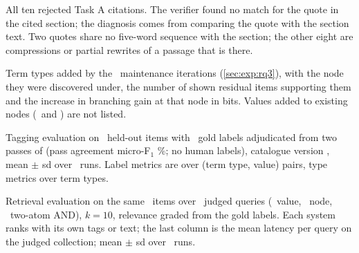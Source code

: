 \begin{table}[t]
  \centering
  \caption{All ten rejected Task A citations. The verifier found no match for
  the quote in the cited section; the diagnosis comes from comparing the quote
  with the section text. Two quotes share no five-word sequence with the
  section; the other eight are compressions or partial rewrites of a passage
  that is there.}
  \label{tab:errors}
  \scriptsize
  
\end{table}
\begin{table}[t]
  \centering
  \caption{Term types added by the \NIterWord\ maintenance iterations
  (\cref{sec:exp:rq3}), with the node they were discovered under, the number
  of shown residual items supporting them and the increase in branching gain
  at that node in bits. Values added to existing nodes (\EAddedValues\ and
  \TAddedValues) are not listed.}
  \label{tab:accepted}
  \scriptsize
  \begin{minipage}[t]{0.49\textwidth}\end{minipage}\hfill
  \begin{minipage}[t]{0.49\textwidth}\end{minipage}
\end{table}
\begin{table}[t]
  \centering
  \caption{Tagging evaluation on \GItems\ held-out items with \GLabels\
  gold labels adjudicated from two passes of \texttt{\GModel} (pass agreement
  micro-F$_1$ \GAgreement\%; no human labels), catalogue version \EvalCat,
  mean $\pm$ sd over \EvalRunsWord\ runs. Label metrics are over (term type, value) pairs, type
  metrics over term types.}
  \label{tab:evaltag}
  \scriptsize
  \begin{minipage}{0.78\textwidth}\end{minipage}
\end{table}

\begin{table}[t]
  \centering
  \caption{Retrieval evaluation on the same \GItems\ items over
  \NQueries\ judged queries (\NQValue\ value, \NQNode\ node, \NQAnd\ two-atom
  AND), $k{=}10$, relevance graded from the gold labels. Each system ranks
  with its own tags or text; the last column is the mean latency per query
  on the judged collection; mean $\pm$ sd over \EvalRunsWord\ runs.}
  \label{tab:evalret}
  \scriptsize
  
\end{table}

